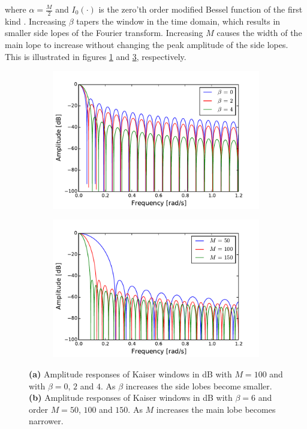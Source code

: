 where $\alpha=\frac{M}{2}$ and $I_0(\cdot)$ is the zero'th order modified Bessel function of the first kind \cite{page 566, DTSP}. Increasing $\beta$ tapers the window in the time domain, which results in smaller side lopes of the Fourier transform. Increasing $M$ causes the width of the main lope to increase without changing the peak amplitude of the side lopes. This is illustrated in figures \ref{fig:kaiser_beta} and \ref{fig:kaiser_order}, respectively.

\begin{figure}[H]
\centering
\begin{subfigure}{0.49\textwidth}
\centering
\includegraphics[width=\textwidth]{figures/dbplots/kaiser_beta.pdf}
\caption{}
\label{fig:kaiser_beta}
\end{subfigure}
\begin{subfigure}{0.49\textwidth}
\centering
\includegraphics[width=\textwidth]{figures/dbplots/kaiser_order.pdf}
\caption{}
\label{fig:kaiser_order}
\end{subfigure}
\caption{\textbf{(a)} Amplitude responses of Kaiser windows in dB with $M=100$ and with $\beta=0$, $2$ and $4$. As $\beta$ increases the side lobes become smaller. \textbf{(b)} Amplitude responses of Kaiser windows in dB with $\beta=6$ and order $M=50$, $100$ and $150$. As $M$ increases the main lobe becomes narrower.}
\end{figure}
 

